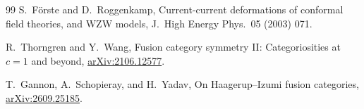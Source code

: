 \documentclass[aps,prl,twocolumn,superscriptaddress,nofootinbib]{revtex4-2}
\begin{document}
\begin{thebibliography}{99}
S.~F\"orste and D.~Roggenkamp,
Current-current deformations of conformal field theories, and WZW
models,
J.\ High Energy Phys.\ 05 (2003) 071.

R.~Thorngren and Y.~Wang,
Fusion category symmetry II: Categoriosities at $c=1$ and beyond,
\href{https://arxiv.org/abs/2106.12577}{arXiv:2106.12577}.

T.~Gannon, A.~Schopieray, and H.~Yadav,
On Haagerup--Izumi fusion categories,
\href{https://arxiv.org/abs/2609.25185}{arXiv:2609.25185}.

\end{thebibliography}
\end{document}
